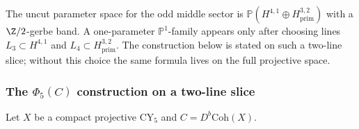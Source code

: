The uncut parameter space for the odd middle sector is
\(\mathbb P(H^{4,1}\oplus H^{3,2}_{\mathrm{prim}})\) with a
\(\Z/2\)-gerbe band. A one-parameter \(\mathbb P^1\)-family appears only
after choosing lines \(L_3\subset H^{4,1}\) and
\(L_4\subset H^{3,2}_{\mathrm{prim}}\). The construction below is stated
on such a two-line slice; without this choice the same formula lives on
the full projective space.

\subsubsection{The \texorpdfstring{$\Phi_5(C)$}{Phi-5(C)} construction on a two-line slice}
\label{subsubsec:phi-5-four-arrow}

Let $X$ be a compact projective CY${}_5$ and $C = D^b\mathrm{Coh}(X)$.

